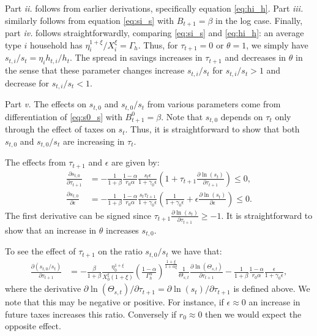 Part \emph{ii.} follows from earlier derivations, specifically equation \eqref{eq:hi_h}. Part \emph{iii.} similarly follows from equation \eqref{eq:si_s} with $B_{t+1} = \beta$ in the log case. Finally, part \emph{iv.} follows straightforwardly, comparing \eqref{eq:si_s} and \eqref{eq:hi_h}: an average type $i$ household has $\eta_i^{1+\xi}/X_i^{\xi} = \Gamma_h$. Thus, for $\tau_{t+1}=0$ or $\theta = 1$, we simply have $s_{t,i} / s_t = \eta_ih_{t,i}/h_t$. The spread in savings increases in $\tau_{t+1}$ and decreases in $\theta$ in the sense that these parameter changes increase $s_{t,i}/s_t$ for $s_{t,i}/s_t>1$ and decrease for $s_{t,i}/s_t<1$.  

Part \emph{v.} The effects on $s_{t,0}$ and $s_{t,0}/s_t$ from various parameters come from differentiation of \eqref{eq:s0_s} with $B_{t+1}^0 = \beta$. Note that $s_{t,0}$ depends on $\tau_t$ only through the effect of taxes on $s_t$. Thus, it is straightforward to show that both $s_{t,0}$ and $s_{t,0}/s_t$ are increasing in $\tau_t$.

The effects from $\tau_{t+1}$ and $\epsilon$ are given by:
\begin{align*}
    \frac{\partial s_{t,0}}{\partial \tau_{t+1}} &= -\frac{1}{1+\beta}\frac{1-\alpha}{r_0\alpha} \frac{s_t\epsilon}{1+\gamma_0\epsilon}\left(1+ \tau_{t+1}\frac{\partial \ln(s_t)}{\partial \tau_{t+1}}\right) \leq 0, \\
    \frac{\partial s_{t,0}}{\partial \epsilon} &= -\frac{1}{1+\beta}\frac{1-\alpha}{r_0\alpha} \frac{s_t\tau_{t+1}}{1+\gamma_0\epsilon}\left(\frac{1}{1+\gamma_0\epsilon}+ \epsilon \frac{\partial \ln(s_t)}{\partial \epsilon}\right)  \leq 0.  
\end{align*}
The first derivative can be signed since $\tau_{t+1}\frac{\partial \ln(s_t)}{\partial \tau_{t+1}} \geq -1$. It is straightforward to show that an increase in $\theta$ increases $s_{t,0}$.

To see the effect of $\tau_{t+1}$ on the ratio $s_{t,0}/s_t$ we have that:
\begin{align*}
    \frac{\partial (s_{t,0}/s_t)}{\partial \tau_{t+1}} &= -\frac{\beta}{1+\beta}\frac{\eta_{0}^{1+\xi}}{X_{0}^{\xi}(1+\xi)}\left(\frac{1-\alpha}{\Gamma_{h}^{\alpha}}\right)^{\frac{1+\xi}{1+\alpha\xi}}
    \frac{1}{\Theta_{s,t}} \frac{\partial \ln\left(\Theta_{s,t}\right)}{\partial \tau_{t+1}}-\frac{1}{1+\beta}\frac{1-\alpha}{r_0\alpha}\frac{\epsilon}{1+\gamma_0\epsilon},
\end{align*}
where the derivative $\partial \ln\left(\Theta_{s,t}\right)/\partial \tau_{t+1} = \partial \ln\left(s_t\right)/\partial \tau_{t+1}$ is defined above. We note that this may be negative or positive. For instance, if $\epsilon \approx 0$ an increase in future taxes increases this ratio. Conversely if $r_0 \approx 0$ then we would expect the opposite effect. 


